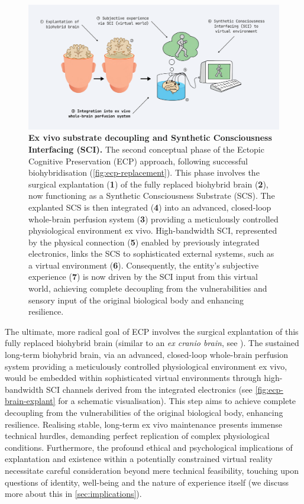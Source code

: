 \documentclass[10pt]{article}
\begin{document}
\begin{sloppypar}
  \begin{figure}[ht]
    \centering
    \includegraphics[width=\textwidth]{figures/ecp-brain-explant.png}
    \caption[ECP: Ex vivo substrate decoupling and synthetic consciousness interfacing]{\textbf{Ex vivo substrate decoupling and Synthetic Consciousness Interfacing (SCI).} The second conceptual phase of the Ectopic Cognitive Preservation (ECP) approach, following successful biohybridisation (\autoref{fig:ecp-replacement}). This phase involves the surgical explantation (\textbf{1}) of the fully replaced biohybrid brain (\textbf{2}), now functioning as a Synthetic Consciousness Substrate (SCS). The explanted SCS is then integrated (\textbf{4}) into an advanced, closed-loop whole-brain perfusion system (\textbf{3}) providing a meticulously controlled physiological environment ex vivo. High-bandwidth SCI, represented by the physical connection (\textbf{5}) enabled by previously integrated electronics, links the SCS to sophisticated external systems, such as a virtual environment (\textbf{6}). Consequently, the entity’s subjective experience (\textbf{7}) is now driven by the SCI input from this virtual world, achieving complete decoupling from the vulnerabilities and sensory input of the original biological body and enhancing resilience.}
    \label{fig:ecp-brain-explant}
  \end{figure}

  The ultimate, more radical goal of ECP involves the surgical explantation of this fully replaced biohybrid brain (similar to an \emph{ex cranio brain}, see \cite{vrselja_restoration_2019}). The sustained long-term biohybrid brain, via an advanced, closed-loop whole-brain perfusion system providing a meticulously controlled physiological environment ex vivo, would be embedded within sophisticated virtual environments through high-bandwidth SCI channels derived from the integrated electronics (see \autoref{fig:ecp-brain-explant} for a schematic visualisation). This step aims to achieve complete decoupling from the vulnerabilities of the original biological body, enhancing resilience. Realising stable, long-term ex vivo maintenance presents immense technical hurdles, demanding perfect replication of complex physiological conditions. Furthermore, the profound ethical and psychological implications of explantation and existence within a potentially constrained virtual reality necessitate careful consideration beyond mere technical feasibility, touching upon questions of identity, well-being and the nature of experience itself (we discuss more about this in \autoref{sec:implications}).



\end{sloppypar}
\end{document}
